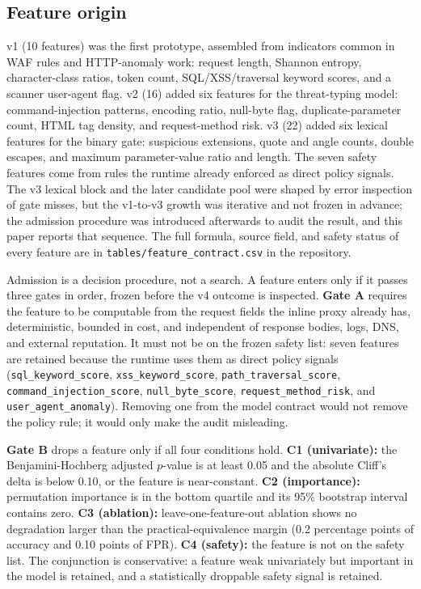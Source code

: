 \documentclass[preprint,11pt]{elsarticle}
\begin{document}
\subsection{Feature origin}\label{feature-origin}

v1 (10 features) was the first prototype, assembled from indicators
common in WAF rules and HTTP-anomaly work: request length, Shannon
entropy, character-class ratios, token count, SQL/XSS/traversal keyword
scores, and a scanner user-agent flag. v2 (16) added six features for
the threat-typing model: command-injection patterns, encoding ratio,
null-byte flag, duplicate-parameter count, HTML tag density, and
request-method risk. v3 (22) added six lexical features for the binary
gate: suspicious extensions, quote and angle counts, double escapes, and
maximum parameter-value ratio and length. The seven safety features come
from rules the runtime already enforced as direct policy signals. The v3
lexical block and the later candidate pool were shaped by error
inspection of gate misses, but the v1-to-v3 growth was iterative and not
frozen in advance; the admission procedure was introduced afterwards to
audit the result, and this paper reports that sequence. The full
formula, source field, and safety status of every feature are in
\texttt{tables/\allowbreak{}feature\_\allowbreak{}contract.\allowbreak{}csv} in the repository.

Admission is a decision procedure, not a search. A feature enters only
if it passes three gates in order, frozen before the v4 outcome is
inspected. \textbf{Gate A} requires the feature to be computable from
the request fields the inline proxy already has, deterministic, bounded
in cost, and independent of response bodies, logs, DNS, and external
reputation. It must not be on the frozen safety list: seven features are
retained because the runtime uses them as direct policy signals
(\texttt{sql\_\allowbreak{}keyword\_\allowbreak{}score}, \texttt{xss\_\allowbreak{}keyword\_\allowbreak{}score},
\texttt{path\_\allowbreak{}traversal\_\allowbreak{}score}, \texttt{command\_\allowbreak{}injection\_\allowbreak{}score},
\texttt{null\_\allowbreak{}byte\_\allowbreak{}score}, \texttt{request\_\allowbreak{}method\_\allowbreak{}risk}, and
\texttt{user\_\allowbreak{}agent\_\allowbreak{}anomaly}). Removing one from the model contract
would not remove the policy rule; it would only make the audit
misleading.

\textbf{Gate B} drops a feature only if all four conditions hold.
\textbf{C1 (univariate):} the Benjamini-Hochberg adjusted \(p\)-value
\citep{benjamini1995controlling} is at least 0.05 and the absolute
Cliff's delta is below 0.10, or the feature is near-constant. \textbf{C2
(importance):} permutation importance is in the bottom quartile and its
95\% bootstrap interval contains zero. \textbf{C3 (ablation):}
leave-one-feature-out ablation shows no degradation larger than the
practical-equivalence margin (0.2 percentage points of accuracy and 0.10
points of FPR). \textbf{C4 (safety):} the feature is not on the safety
list. The conjunction is conservative: a feature weak univariately but
important in the model is retained, and a statistically droppable safety
signal is retained.
\end{document}

